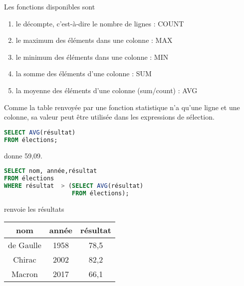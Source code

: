 Les fonctions disponibles sont 
\begin{enumerate}
\item le décompte, c'est-à-dire le nombre de lignes : COUNT
\item le maximum des éléments dans une colonne : MAX
\item le minimum des éléments dans une colonne : MIN
\item la somme des éléments d'une colonne : SUM
\item la moyenne  des éléments d'une colonne (sum/count) : AVG
\end{enumerate}
Comme la table renvoyée par une fonction statistique n'a qu'une ligne et une colonne, sa valeur peut être utilisée dans les expressions de sélection.
\begin{lstlisting}[language=SQL]
SELECT AVG(résultat) 
FROM élections;
\end{lstlisting}
donne 59,09.
\begin{lstlisting}[language=SQL]
SELECT nom, année,résultat  
FROM élections 
WHERE résultat  > (SELECT AVG(résultat) 
                   FROM élections);
\end{lstlisting}
renvoie les résultats
\begin{center}
\begin{tabular}{|c|c|c|}
\hline
{\bf nom} & {\bf année}&{\bf résultat}\\
  \hline
de Gaulle & 1958 & 78,5\\
Chirac    & 2002 & 82,2\\
Macron & 2017 & 66,1\\
\hline
\end{tabular}
\end{center}
\newpage
